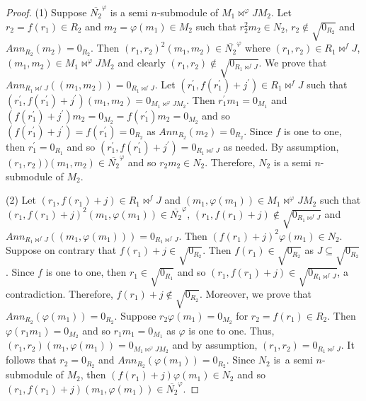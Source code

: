 \documentclass{amsart}%
\theoremstyle{plain}
\numberwithin{equation}{section}
\begin{document}
\begin{proof}
(1) Suppose $\overline{N_{2}}^{\varphi}$ is a semi $n$-submodule of
$M_{1}\Join^{\varphi}JM_{2}$. Let $r_{2}=f(r_{1})\in R_{2}$ and $m_{2}%
=\varphi(m_{1})\in M_{2}$ such that $r_{2}^{2}m_{2}\in N_{2}$, $r_{2}%
\notin\sqrt{0_{R_{2}}}$ and $Ann_{R_{2}}(m_{2})=0_{R_{2}}$. Then $(r_{1}%
,r_{2})^{2}(m_{1},m_{2})\in\overline{N_{2}}^{\varphi}$ where $(r_{1},r_{2})\in
R_{1}\Join^{f}J$, $(m_{1},m_{2})\in M_{1}\Join^{\varphi}JM_{2}$ and clearly
$(r_{1},r_{2})\notin\sqrt{0_{R_{1}\Join^{f}J}}$. We prove that $Ann_{R_{1}%
\Join^{f}J}((m_{1},m_{2}))=0_{R_{1}\Join^{f}J}$. Let $(r_{1}^{\prime}%
,f(r_{1}^{\prime})+j^{\prime})\in R_{1}\Join^{f}J$ such that $(r_{1}^{\prime
},f(r_{1}^{\prime})+j^{\prime})(m_{1},m_{2})=0_{M_{1}\Join^{\varphi}JM_{2}}$.
Then $r_{1}^{\prime}m_{1}=0_{M_{1}}$ and $(f(r_{1}^{\prime})+j^{\prime}%
)m_{2}=0_{M_{2}}=f(r_{1}^{\prime})m_{2}=0_{M_{2}}$ and so $(f(r_{1}^{\prime
})+j^{\prime})=f(r_{1}^{\prime})=0_{R_{2}}$ as $Ann_{R_{2}}(m_{2})=0_{R_{2}}$.
Since $f$ is one to one, then $r_{1}^{\prime}=0_{R_{1}}$ and so $(r_{1}%
^{\prime},f(r_{1}^{\prime})+j^{\prime})=0_{R_{1}\Join^{f}J}$ as needed. By
assumption, $(r_{1},r_{2}))(m_{1},m_{2})\in\overline{N_{2}}^{\varphi}$ and so
$r_{2}m_{2}\in N_{2}$. Therefore, $N_{2}$ is a semi $n$-submodule of $M_{2}$.

(2) Let $(r_{1},f(r_{1})+j)\in R_{1}\Join^{f}J$ and $(m_{1},\varphi(m_{1}))\in
M_{1}\Join^{\varphi}JM_{2}$ such that $(r_{1},f(r_{1})+j)^{2}(m_{1}%
,\varphi(m_{1}))\in\overline{N_{2}}^{\varphi}$, $(r_{1},f(r_{1})+j)\notin
\sqrt{0_{R_{1}\Join^{f}J}}$ and $Ann_{R_{1}\Join^{f}J}((m_{1},\varphi
(m_{1})))=0_{R_{1}\Join^{f}J}$. Then $(f(r_{1})+j)^{2}\varphi(m_{1})\in N_{2}%
$. Suppose on contrary that $f(r_{1})+j\in\sqrt{0_{R_{2}}}$. Then $f(r_{1}%
)\in\sqrt{0_{R_{2}}}$ as $J\subseteq\sqrt{0_{R_{2}}}$. Since $f$ is one to
one, then $r_{1}\in\sqrt{0_{R_{1}}}$ and so $(r_{1},f(r_{1})+j)\in
\sqrt{0_{R_{1}\Join^{f}J}}$, a contradiction. Therefore, $f(r_{1}%
)+j\notin\sqrt{0_{R_{2}}}$. Moreover, we prove that $Ann_{R_{2}}(\varphi
(m_{1}))=0_{R_{2}}$. Suppose $r_{2}\varphi(m_{1})=0_{M_{2}}$ for
$r_{2}=f(r_{1})\in R_{2}$. Then $\varphi(r_{1}m_{1})=0_{M_{2}}$ and so
$r_{1}m_{1}=0_{M_{1}}$ as $\varphi$ is one to one. Thus, $(r_{1},r_{2}%
)(m_{1},\varphi(m_{1}))=0_{M_{1}\Join^{\varphi}JM_{2}}$ and by assumption,
$(r_{1},r_{2})=0_{R_{1}\Join^{f}J}$. It follows that $r_{2}=0_{R_{2}}$ and
$Ann_{R_{2}}(\varphi(m_{1}))=0_{R_{2}}$. Since $N_{2}$ is\ a semi
$n$-submodule of $M_{2}$, then $(f(r_{1})+j)\varphi(m_{1})\in N_{2}$ and so
$(r_{1},f(r_{1})+j)(m_{1},\varphi(m_{1}))\in\overline{N_{2}}^{\varphi}$.
\end{proof}
\end{document}
